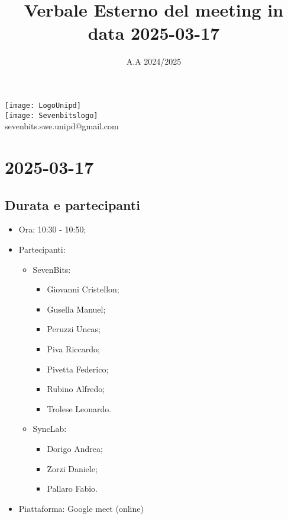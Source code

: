 \documentclass[10pt]{article}
\title{Verbale Esterno del meeting in data 2025-03-17} %
\date{A.A 2024/2025}
\begin{document}
\maketitle
\center 
\texttt{[image: LogoUnipd]}\\
\texttt{[image: Sevenbitslogo]}\\
sevenbits.swe.unipd@gmail.com\\
\vspace{2mm}

\newpage
\raggedright
\tableofcontents

\newpage
\section{2025-03-17} %
\subsection{Durata e partecipanti}
\begin{itemize}
\item Ora: 10:30 - 10:50; %
\item Partecipanti: 	
	\begin{itemize}
            \item SevenBits:
            \begin{itemize}
                \item Giovanni Cristellon;
                \item Gusella Manuel;
                \item Peruzzi Uncas;
                \item Piva Riccardo;
                \item Pivetta Federico;
                \item Rubino Alfredo;
                \item Trolese Leonardo.
	    \end{itemize}
            \item SyncLab:
            \begin{itemize}
                \item Dorigo Andrea;
                \item Zorzi Daniele;
                \item Pallaro Fabio.
	    \end{itemize}
	\end{itemize}
\item Piattaforma: Google meet (online)
\end{itemize}
\end{document}
